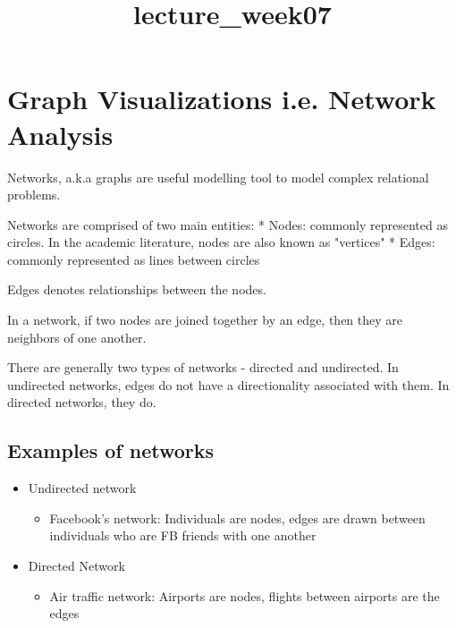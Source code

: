 \documentclass[11pt]{article}
\title{lecture\_week07}
\providecommand{\tightlist}{%
      \setlength{\itemsep}{0pt}\setlength{\parskip}{0pt}}
\begin{document}
    
    
    \maketitle
    
    

    
    \section{Graph Visualizations i.e. Network
Analysis}\label{graph-visualizations-i.e.-network-analysis}

    Networks, a.k.a graphs are useful modelling tool to model complex
relational problems.

Networks are comprised of two main entities: * Nodes: commonly
represented as circles. In the academic literature, nodes are also known
as "vertices" * Edges: commonly represented as lines between circles

Edges denotes relationships between the nodes.

In a network, if two nodes are joined together by an edge, then they are
neighbors of one another.

There are generally two types of networks - directed and undirected. In
undirected networks, edges do not have a directionality associated with
them. In directed networks, they do.

    \subsection{Examples of networks}\label{examples-of-networks}

\begin{itemize}
\tightlist
\item
  Undirected network

  \begin{itemize}
  \tightlist
  \item
    Facebook's network: Individuals are nodes, edges are drawn between
    individuals who are FB friends with one another
  \end{itemize}
\item
  Directed Network

  \begin{itemize}
  \tightlist
  \item
    Air traffic network: Airports are nodes, flights between airports
    are the edges
  \end{itemize}
\end{itemize}
\end{document}
